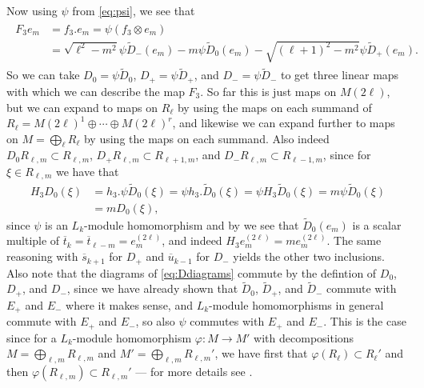 Now using $\psi$ from \cref{eq:psi}, we see that
\begin{align}\label{eq:F_3action}
  \begin{aligned}
    F_3e_m &= f_3 . e_m = \psi(f_3\otimes e_m) \\
    &= \sqrt{\ell^2-m^2}\psi \widetilde D_-(e_m) - m\psi \widetilde D_0(e_m) - \sqrt{(\ell+1)^2-m^2}\psi \widetilde D_+(e_m).
  \end{aligned}
\end{align}
So we can take $D_0=\psi\widetilde D_0$, $D_+ = \psi\widetilde D_+$, and $D_- = \psi\widetilde D_-$ to get three linear maps with which we can describe the map $F_3$. So far this is just maps on $M(2\ell)$, but we can expand to maps on $R_\ell$ by using the maps on each summand of $R_\ell=M(2\ell)^1 \oplus \dotsb \oplus M(2\ell)^r$, and likewise we can expand further to maps on $M=\bigoplus_\ell R_\ell$ by using the maps on each summand. Also indeed $D_0R_{\ell,m}\subset R_{\ell,m}$, $D_+R_{\ell,m}\subset R_{\ell+1,m}$, and $D_-R_{\ell,m}\subset R_{\ell-1,m}$, since for $\xi\in R_{\ell,m}$ we have that
\begin{align*}
  H_3D_0(\xi) &= h_3 . \psi\widetilde D_0(\xi) = \psi h_3 . \widetilde D_0(\xi) = \psi H_3 \widetilde D_0(\xi) = m\psi \widetilde D_0(\xi) \\
  &= m D_0(\xi),
\end{align*}
since $\psi$ is an $L_k$-module homomorphism and by  we see that $\widetilde D_0(e_m)$ is a scalar multiple of $\overline t_k = \overline t_{\ell-m} = e_m^{(2\ell)}$, and indeed $H_3e_m^{(2\ell)}=me_m^{(2\ell)}$. The same reasoning with $\overline s_{k+1}$ for $D_+$ and $\overline u_{k-1}$ for $D_-$ yields the other two inclusions. Also note that the diagrams of \cref{eq:Ddiagrams} commute by the defintion of $D_0$, $D_+$, and $D_-$, since we have already shown that $\widetilde D_0$, $\widetilde D_+$, and $\widetilde D_-$ commute with $E_+$ and $E_-$ where it makes sense, and $L_k$-module homomorphisms in general commute with $E_+$ and $E_-$, so also $\psi$ commutes with $E_+$ and $E_-$. This is the case since for a $L_k$-module homomorphism $\varphi\colon M\to M'$ with decompositions $M=\bigoplus_{\ell,m} R_{\ell,m}$ and $M'=\bigoplus_{\ell,m} R_{\ell,m}'$, we have first that $\varphi(R_\ell)\subset R_\ell'$ and then $\varphi(R_{\ell,m}) \subset R_{\ell,m}'$ --- for more details see .

